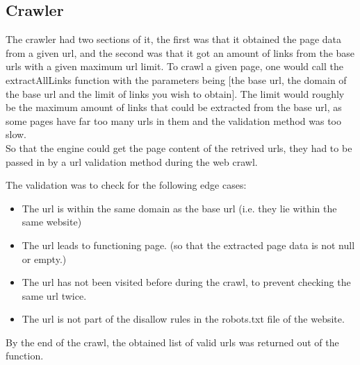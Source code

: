 \subsection{Crawler}

The crawler had two sections of it, the first was that it obtained the page data from a given url, and the second was that it got an amount of links from the base urls with a given maximum url limit.
To crawl a given page, one would call the extractAllLinks function with the parameters being [the base url, the domain of the base url and the limit of links you wish to obtain]. 
The limit would roughly be the maximum amount of links that could be extracted from the base url, as some pages have far too many urls in them and the validation method was too slow. \\

So that the engine could get the page content of the retrived urls, they had to be passed in by a url validation method during the web crawl.

The validation was to check for the following edge cases:
\begin{itemize}
    \item The url is within the same domain as the base url (i.e. they lie within the same website)
    \item The url leads to functioning page. (so that the extracted page data is not null or empty.)
    \item The url has not been visited before during the crawl, to prevent checking the same url twice.
    \item The url is not part of the disallow rules in the robots.txt file of the website.
\end{itemize}

By the end of the crawl, the obtained list of valid urls was returned out of the function.
